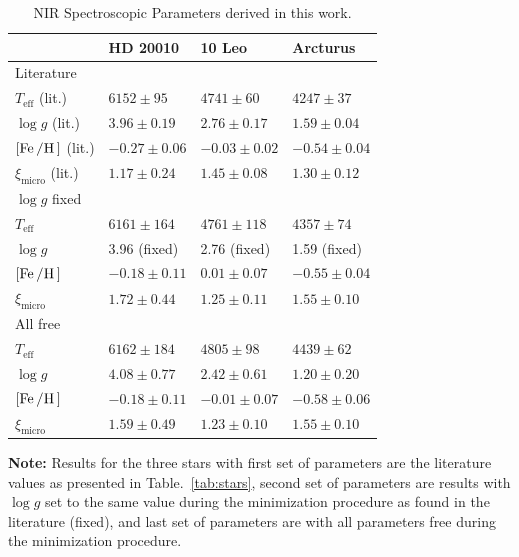 \documentclass[a4paper,fleqn,usenatbib]{mnras}
\begin{document}
\begin{table}
    \caption{NIR Spectroscopic Parameters derived in this work.}
    \label{tab:results}
    \centering
    \begin{tabular}{llll}
      \hline\hline
                                    & HD 20010          &  10 Leo           &  Arcturus        \\
      \hline
        Literature                  &                   &                   &                  \\
        $T_\mathrm{eff}$ (lit.)     & $6152 \pm  95$    &  $4741 \pm  60$   & $4247 \pm 37$   \\
        $\log g$ (lit.)             & $3.96 \pm 0.19$   &  $2.76 \pm 0.17$  & $1.59 \pm 0.04$  \\
        $[\ion{Fe}/\ion{H}]$ (lit.) & $-0.27 \pm 0.06$  &  $-0.03 \pm 0.02$ & $-0.54 \pm 0.04$ \\
        $\xi_\mathrm{micro}$ (lit.) & $1.17 \pm 0.24$   &  $1.45 \pm 0.08$  & $1.30 \pm 0.12$  \\
      \hline
        $\log g$ fixed              &                   &                   &                  \\
        $T_\mathrm{eff}$            & $6161 \pm 164$    &  $4761 \pm 118$   & $4357 \pm  74$   \\
        $\log g$                    & 3.96 (fixed)      &  2.76 (fixed)     & 1.59 (fixed)     \\
        $[\ion{Fe}/\ion{H}]$        & $-0.18 \pm 0.11$  &  $ 0.01 \pm 0.07$ & $-0.55 \pm 0.04$ \\
        $\xi_\mathrm{micro}$        & $1.72 \pm 0.44$   &  $1.25 \pm 0.11$  & $1.55 \pm 0.10$  \\
      \hline
        All free                    &                   &                   &                  \\
        $T_\mathrm{eff}$            & $6162 \pm 184$    &  $4805 \pm  98$   & $4439 \pm  62$   \\
        $\log g$                    & $4.08 \pm 0.77$   &  $2.42 \pm 0.61$  & $1.20 \pm 0.20$  \\
        $[\ion{Fe}/\ion{H}]$        & $-0.18 \pm 0.11$  &  $-0.01 \pm 0.07$ & $-0.58 \pm 0.06$ \\
        $\xi_\mathrm{micro}$        & $1.59 \pm 0.49$   &  $1.23 \pm 0.10$  & $1.55 \pm 0.10$  \\
        \hline\hline
    \end{tabular}
     \vspace{1ex}

     \raggedright
     \textbf{Note:} Results for the three stars with first set of parameters
     are the literature values as presented in Table.~\ref{tab:stars}, second set of parameters 
     are results with $\log g$ set to the same value during the minimization procedure as found 
     in the literature (fixed), and last set of parameters are with all parameters free during 
     the minimization procedure.
     
\end{table}
\end{document}

